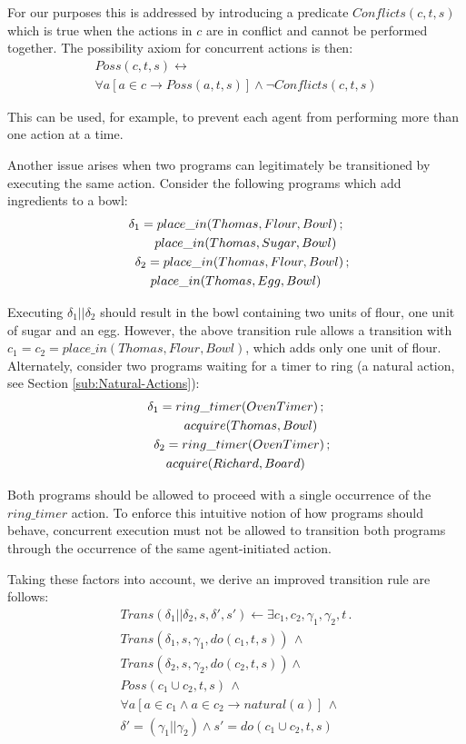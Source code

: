 \documentclass[letterpaper]{article}
\begin{document}
For our purposes this is addressed by introducing a predicate $Conflicts(c,t,s)$
which is true when the actions in $c$ are in conflict and cannot
be performed together. The possibility axiom for concurrent actions
is then:
\begin{multline}
Poss(c,t,s)\leftrightarrow\\
\forall a\left[a\in c\rightarrow Poss(a,t,s)\right]\wedge\neg Conflicts(c,t,s)
\end{multline}

This can be used, for example, to prevent each agent from performing
more than one action at a time.

Another issue arises when two programs can legitimately be transitioned
by executing the same action. Consider the following programs which
add ingredients to a bowl:
\begin{multline}
\delta_{1}=place\_ in(Thomas,Flour,Bowl)\,;\\
   \shoveright{place\_ in(Thomas,Sugar,Bowl)}\\
\shoveleft{\delta_{2}=place\_ in(Thomas,Flour,Bowl)\,;}\\
   place\_ in(Thomas,Egg,Bowl)
\end{multline}

Executing $\delta_{1}||\delta_{2}$ should result in the bowl containing
two units of flour, one unit of sugar and an egg. However, the above
transition rule allows a transition with $c_{1}=c_{2}=place\_ in(Thomas,Flour,Bowl)$,
which adds only one unit of flour. Alternately, consider two programs
waiting for a timer to ring (a natural action, see Section \ref{sub:Natural-Actions}):
\begin{multline}
\delta_{1}=ring\_ timer(OvenTimer)\,;\\
   \shoveright{acquire(Thomas,Bowl)}\\
\shoveleft{\delta_{2}=ring\_ timer(OvenTimer)\,;}\\
    acquire(Richard,Board)
\end{multline}


Both programs should be allowed to proceed with a single occurrence
of the $ring\_ timer$ action. To enforce this intuitive notion of
how programs should behave, concurrent execution must not be allowed
to transition both programs through the occurrence of the same agent-initiated
action.

Taking these factors into account, we derive an improved transition
rule are follows:
\begin{multline}
Trans(\delta_{1}||\delta_{2},s,\delta',s')\leftarrow \exists c_{1},c_{2},\gamma_{1},\gamma_{2},t\,.\\
Trans(\delta_{1},s,\gamma_{1},do(c_{1},t,s))\,\wedge\\
Trans(\delta_{2},s,\gamma_{2},do(c_{2},t,s))\wedge\\
Poss(c_{1}\cup c_{2},t,s)\,\wedge\\
\forall a\left[a\in c_{1}\wedge a\in c_{2}\rightarrow natural(a)\right]\,\wedge\\
\delta'=(\gamma_{1}||\gamma_{2})\wedge s'=do(c_{1}\cup c_{2},t,s)
\end{multline}
\end{document}
